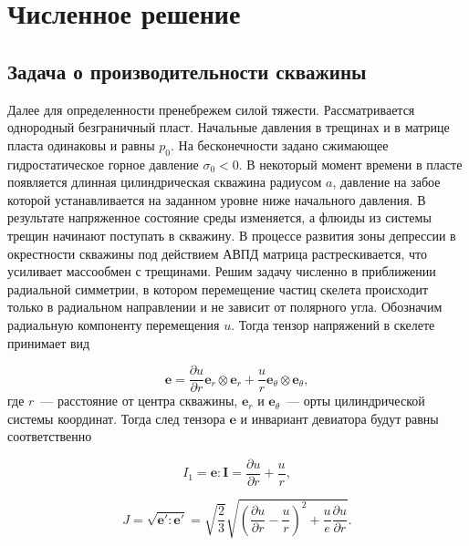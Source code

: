 \chapter{Численное решение}\label{ch:ch3}

\section{Задача о производительности скважины}\label{sec:ch3/sect1}

Далее для определенности пренебрежем силой тяжести. Рассматривается однородный безграничный пласт. Начальные давления в трещинах и в матрице пласта одинаковы и равны $p_0$. На бесконечности задано сжимающее гидростатическое горное давление $\sigma_0 < 0$. В некоторый момент времени в пласте появляется длинная цилиндрическая скважина радиусом $a$, давление на забое которой устанавливается на заданном уровне ниже начального давления. В результате напряженное состояние среды изменяется, а флюиды из системы трещин начинают поступать в скважину. В процессе развития зоны депрессии в окрестности скважины под действием АВПД матрица растрескивается, что усиливает массообмен с трещинами.
Решим задачу численно в приближении радиальной симметрии, в котором перемещение частиц скелета происходит только в радиальном направлении и не зависит от полярного угла. Обозначим радиальную компоненту перемещения $u$. Тогда тензор напряжений в скелете принимает вид

\begin{equation}
  \label{eq:e}
  \textbf{e}  =\frac{\partial u}{\partial r} \textbf{e}_r \otimes \textbf{e}_r + \frac{u}{r} \textbf{e}_{\theta} \otimes \textbf{e}_{\theta},
\end{equation}
где $r$~--- расстояние от центра скважины, $\textbf{e}_{r}$ и $\textbf{e}_{\theta}$~--- орты цилиндрической системы координат. Тогда след тензора $\textbf{e}$ и инвариант девиатора будут равны соответственно

\begin{equation}
  \label{eq:i1}
  I_1 = \textbf{e} : \textbf{I} = \frac{\partial u}{\partial r} + \frac{u}{r},
\end{equation}

\begin{equation}
  \label{eq:J}
  J = \sqrt{\textbf{e}' : \textbf{e}'} = \sqrt{\frac{2}{3}} \sqrt{\left( \frac{\partial u}{\partial r} - \frac{u}{r} \right)^2 + \frac{u}{e} \frac{\partial u}{\partial r}}.
\end{equation}

